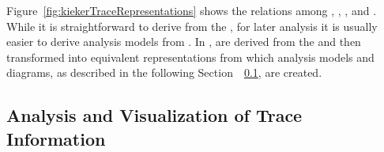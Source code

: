 Figure~\ref{fig:kiekerTraceRepresentations} shows the relations among \executions{}, %
\Messages{}, \executionTraces{}, and \messageTraces{}. %
While it is straightforward to derive \executionTraces{} from the \MonitoringLog{}, %
for later analysis it is usually easier to derive analysis models from \messageTraces{}. %
In \KiekerTpan{}, \executionTraces{} are derived from the \MonitoringLog{} and %
then transformed into equivalent \messageTrace{} representations from which %
analysis models and diagrams, as described in the following \mbox{Section~%
\ref{sec:traceAnalysisAndVisualization}}, are created.




% 
% 
% 
% 
\subsection{Analysis and Visualization of Trace Information}\label{sec:traceAnalysisAndVisualization}

